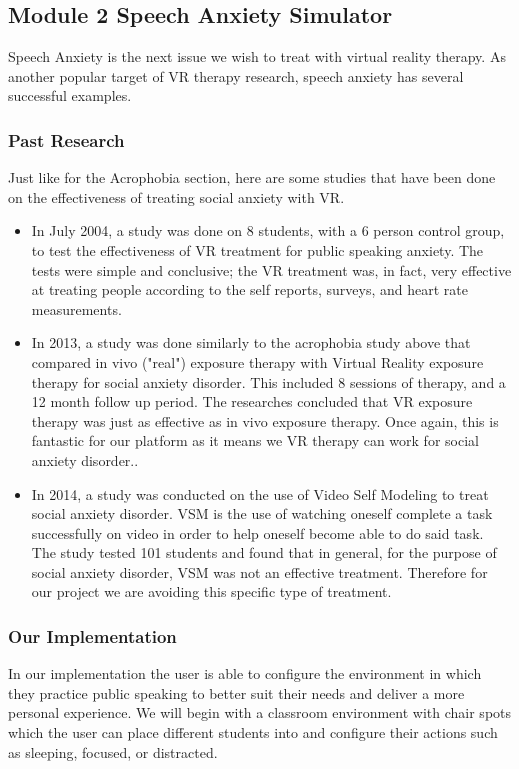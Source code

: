 \documentclass[a4paper,10pt]{article}
\begin{document}
\subsection{Module 2 Speech Anxiety Simulator}
Speech Anxiety is the next issue we wish to treat with virtual reality therapy. As another popular target of VR therapy research, speech anxiety has several successful examples.

\subsubsection{Past Research}
Just like for the Acrophobia section, here are some studies that have been done on the effectiveness of treating social anxiety with VR.
\begin{itemize}
	\item In July 2004, a study was done on 8 students, with a 6 person control group, to test the effectiveness of VR treatment for public speaking anxiety.  The tests were simple and conclusive; the VR treatment was, in fact, very effective at treating people according to the self reports, surveys, and heart rate measurements.\cite{anxOne}
	\item In 2013, a study was done similarly to the acrophobia study above that compared in vivo ("real") exposure therapy with Virtual Reality exposure therapy for social anxiety disorder.  This included 8 sessions of therapy, and a 12 month follow up period.  The researches concluded that VR exposure therapy was just as effective as in vivo exposure therapy.  Once again, this is fantastic for our platform as it means we VR therapy can work for social anxiety disorder..\cite{anxTwo}
	\item In 2014, a study was conducted on the use of Video Self Modeling to treat social anxiety disorder.  VSM is the use of watching oneself complete a task successfully on video in order to help oneself become able to do said task.  The study tested 101 students and found that in general, for the purpose of social anxiety disorder, VSM was not an effective treatment.  Therefore for our project we are avoiding this specific type of treatment.\cite{anxThree}
\end{itemize}

\subsubsection{Our Implementation}
In our implementation the user is able to configure the environment in which they practice public speaking to better suit their needs and deliver a more personal experience. We will begin with a classroom environment with chair spots which the user can place different students into and configure their actions such as sleeping, focused, or distracted.
\end{document}
